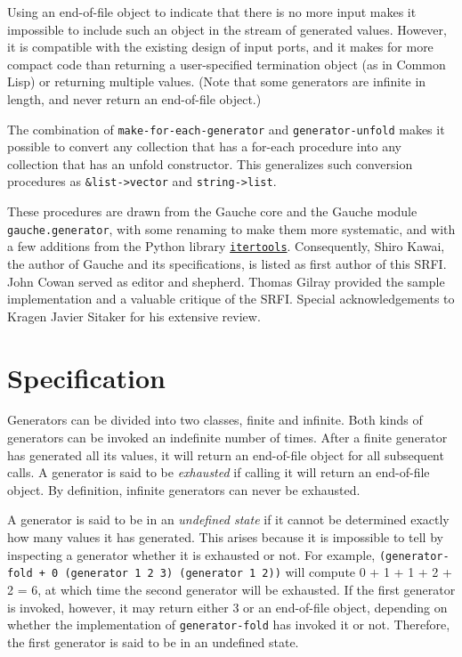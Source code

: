 Using an end-of-file object to indicate that there is no more input
makes it impossible to include such an object in the stream of generated
values. However, it is compatible with the existing design of input
ports, and it makes for more compact code than returning a
user-specified termination object (as in Common Lisp) or returning
multiple values. (Note that some generators are infinite in length, and
never return an end-of-file object.)

The combination of \texttt{make-for-each-generator} and
\texttt{generator-unfold} makes it possible to convert any collection
that has a for-each procedure into any collection that has an unfold
constructor. This generalizes such conversion procedures as
\texttt{\&list-\textgreater{}vector} and
\texttt{string-\textgreater{}list}.

These procedures are drawn from the Gauche core and the Gauche module
\texttt{gauche.generator}, with some renaming to make them more
systematic, and with a few additions from the Python library
\href{https://docs.python.org/3/library/itertools.html}{\texttt{itertools}}.
Consequently, Shiro Kawai, the author of Gauche and its specifications,
is listed as first author of this SRFI. John Cowan served as editor and
shepherd. Thomas Gilray provided the sample implementation and a
valuable critique of the SRFI. Special acknowledgements to Kragen Javier
Sitaker for his extensive review.

\section{Specification}\label{specification}

Generators can be divided into two classes, finite and infinite. Both
kinds of generators can be invoked an indefinite number of times. After
a finite generator has generated all its values, it will return an
end-of-file object for all subsequent calls. A generator is said to be
\emph{exhausted} if calling it will return an end-of-file object. By
definition, infinite generators can never be exhausted.

A generator is said to be in an \emph{undefined state} if it cannot be
determined exactly how many values it has generated. This arises because
it is impossible to tell by inspecting a generator whether it is
exhausted or not. For example,
\texttt{(generator-fold\ +\ 0\ (generator\ 1\ 2\ 3)\ (generator\ 1\ 2))}
will compute 0 + 1 + 1 + 2 + 2 = 6, at which time the second generator
will be exhausted. If the first generator is invoked, however, it may
return either 3 or an end-of-file object, depending on whether the
implementation of \texttt{generator-fold} has invoked it or not.
Therefore, the first generator is said to be in an undefined state.

